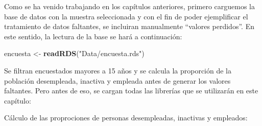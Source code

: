 \documentclass[
  spanish,
  12pt,
]{book}
\newenvironment{Shaded}{\begin{snugshade}}{\end{snugshade}}
\newcommand{\AttributeTok}[1]{\textcolor[rgb]{0.13,0.29,0.53}{#1}}
\newcommand{\CommentTok}[1]{\textcolor[rgb]{0.56,0.35,0.01}{\textit{#1}}}
\newcommand{\ConstantTok}[1]{\textcolor[rgb]{0.56,0.35,0.01}{#1}}
\newcommand{\DecValTok}[1]{\textcolor[rgb]{0.00,0.00,0.81}{#1}}
\newcommand{\FunctionTok}[1]{\textcolor[rgb]{0.13,0.29,0.53}{\textbf{#1}}}
\newcommand{\NormalTok}[1]{#1}
\newcommand{\OtherTok}[1]{\textcolor[rgb]{0.56,0.35,0.01}{#1}}
\newcommand{\SpecialCharTok}[1]{\textcolor[rgb]{0.81,0.36,0.00}{\textbf{#1}}}
\newcommand{\StringTok}[1]{\textcolor[rgb]{0.31,0.60,0.02}{#1}}
\begin{document}
Como se ha venido trabajando en los capítulos anteriores, primero carguemos la base de datos con la muestra seleccionada y con el fin de poder ejemplificar el tratamiento de datos faltantes, se incluiran manualmente ``valores perdidos''. En este sentido, la lectura de la base se hará a continuación:

\begin{Shaded}
\begin{Highlighting}[]
\NormalTok{encuesta }\OtherTok{\textless{}{-}} \FunctionTok{readRDS}\NormalTok{(}\StringTok{"Data/encuesta.rds"}\NormalTok{) }
\end{Highlighting}
\end{Shaded}

Se filtran encuestados mayores a 15 años y se calcula la proporción de la población desempleada, inactiva y empleada antes de generar los valores faltantes. Pero antes de eso, se cargan todas las librerías que se utilizarán en este capítulo:

\begin{Shaded}
\end{Shaded}

Cálculo de las proprociones de personas desempleadas, inactivas y empleados:

\begin{Shaded}
\end{Shaded}
\end{document}
